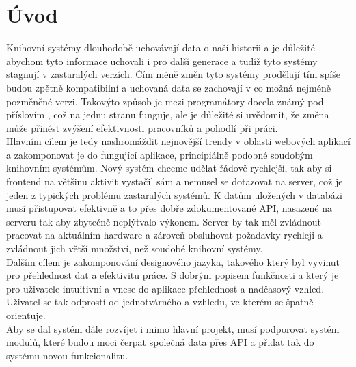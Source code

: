\chapter{Úvod}
Knihovní systémy dlouhodobě uchovávají data o naší historii a je důležité abychom
tyto informace uchovali i pro další generace a tudíž tyto systémy stagnují v
zastaralých verzích. Čím méně změn tyto systémy prodělají tím spíše budou zpětně
kompatibilní a uchovaná data se zachovají v co možná nejméně pozměněné verzi.
Takovýto způsob je mezi programátory docela známý pod příslovím
, což na jednu stranu funguje, ale
je důležité si uvědomit, že změna může přinést
zvýšení efektivnosti pracovníků a pohodlí při práci.
\\

Hlavním cílem je tedy nashromáždit nejnovější trendy v oblasti webových
aplikací a zakomponovat je do fungující aplikace, principiálně podobné
soudobým knihovním systémům. Nový systém chceme udělat řádově rychlejší,
tak aby si frontend na většinu aktivit vystačil sám a nemusel se dotazovat
na server, což je jeden z typických problému zastaralých systémů.
K datům uložených v databázi musí přistupovat efektivně a to přes
dobře zdokumentované API, nasazené na serveru tak aby zbytečně
neplýtvalo výkonem. Server by tak měl zvládnout pracovat na
aktuálním hardware a zároveň obsluhovat požadavky rychleji a
zvládnout jich větší množství, než soudobé knihovní systémy.
\\

Dalším cílem je zakomponování designového jazyka, takového
který byl vyvinut pro přehlednost dat a efektivitu práce.
S dobrým popisem funkčnosti a který je pro uživatele 
intuitivní a vnese do aplikace přehlednost a nadčasový vzhled.
Uživatel se tak odprostí od jednotvárného a  vzhledu,
ve kterém se špatně orientuje.
\\

Aby se dal systém dále rozvíjet i mimo hlavní projekt, musí
podporovat systém modulů, které budou moci čerpat společná data přes
API a přidat tak do systému novou funkcionalitu.

